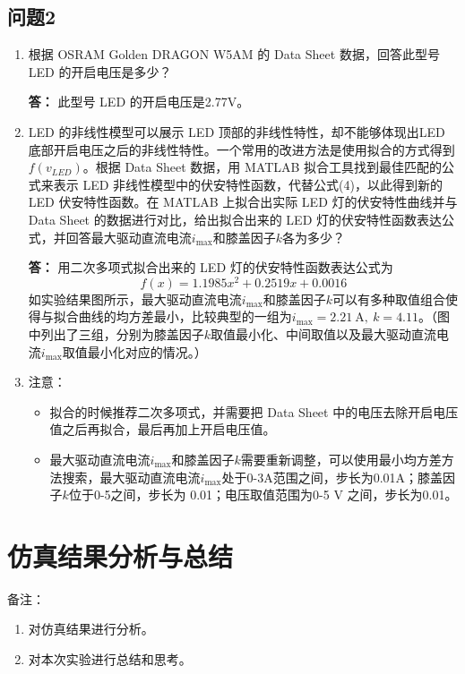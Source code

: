 \documentclass[11pt]{article}
\providecommand{\tightlist}{\setlength{\itemsep}{0pt}\setlength{\parskip}{0.2pt}}
\begin{document}
\subsection{问题2}
\begin{enumerate}[label = \alph*)]
  \item 根据 OSRAM Golden DRAGON W5AM 的 Data Sheet 数据，回答此型号 LED 的开启电压是多少？
  
  \textbf{答：} 此型号 LED 的开启电压是2.77V。
  \item LED 的非线性模型可以展示 LED 顶部的非线性特性，却不能够体现出LED 底部开启电压之后的非线性特性。一个常用的改进方法是使用拟合的方式得到$f(v_{LED})$。根据 Data Sheet 数据，用 MATLAB 拟合工具找到最佳匹配的公式来表示 LED 非线性模型中的伏安特性函数，代替公式(4)，以此得到新的 LED 伏安特性函数。在 MATLAB 上拟合出实际 LED 灯的伏安特性曲线并与 Data Sheet 的数据进行对比，给出拟合出来的 LED 灯的伏安特性函数表达公式，并回答最大驱动直流电流$i_{\mathrm{max}}$和膝盖因子$k$各为多少？
  
  \textbf{答：} 用二次多项式拟合出来的 LED 灯的伏安特性函数表达公式为$$f(x)=1.1985x^{2}+0.2519x+0.0016$$如实验结果图所示，最大驱动直流电流$i_{\mathrm{max}}$和膝盖因子$k$可以有多种取值组合使得与拟合曲线的均方差最小，比较典型的一组为$i_{\mathrm{max}}=2.21 \mathrm{~A},\ k=4.11$。（图中列出了三组，分别为膝盖因子$k$取值最小化、中间取值以及最大驱动直流电流$i_{\mathrm{max}}$取值最小化对应的情况。）
  \item 注意： 
  \begin{itemize}
      \tightlist \small
    \item 拟合的时候推荐二次多项式，并需要把 Data Sheet 中的电压去除开启电压值之后再拟合，最后再加上开启电压值。
    \item 最大驱动直流电流$i_{\mathrm{max}}$和膝盖因子$k$需要重新调整，可以使用最小均方差方法搜索，最大驱动直流电流$i_{\mathrm{max}}$处于0-3A范围之间，步长为0.01A；膝盖因子$k$位于0-5之间，步长为 0.01；电压取值范围为0-5 V 之间，步长为0.01。
  \end{itemize}
\end{enumerate}

\section{仿真结果分析与总结}
备注：
\begin{enumerate}
  \tightlist
  \item 对仿真结果进行分析。
  \item 对本次实验进行总结和思考。
\end{enumerate}
\end{document}
